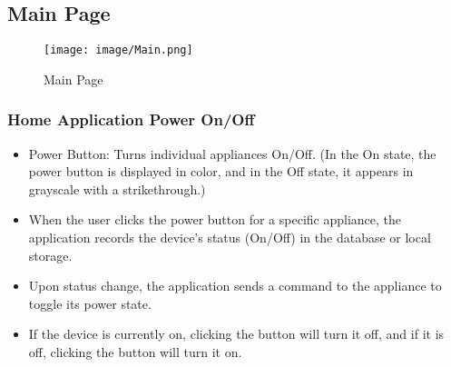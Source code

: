 \documentclass[conference]{IEEEtran}
\begin{document}
\subsection{Main Page}

\begin{figure}[h!]
    \centering
    \texttt{[image: image/Main.png]}
    \caption{Main Page}
    \label{fig:enter-label}
\end{figure}



\subsubsection{Home Application Power On/Off}

\begin{itemize}
    \item Power Button: Turns individual appliances On/Off. (In the On state, the power button is displayed in color, and in the Off state, it appears in grayscale with a strikethrough.)\\
    \item When the user clicks the power button for a specific appliance, the application records the device's status (On/Off) in the database or local storage.\\
    \item Upon status change, the application sends a command to the appliance to toggle its power state.\\
    \item If the device is currently on, clicking the button will turn it off, and if it is off, clicking the button will turn it on.\\
\end{itemize}\\
\end{document}
